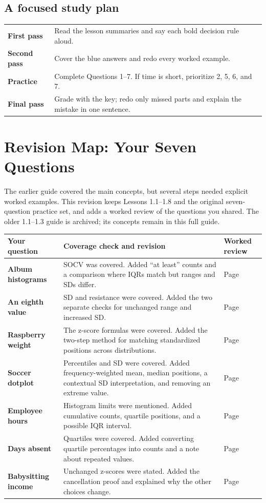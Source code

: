 \documentclass[11pt]{article}
\begin{document}
\subsection*{A focused study plan}
\begin{tabularx}{\textwidth}{>{\bfseries\color{Teal}}p{0.90in} Y}
First pass & Read the lesson summaries and say each bold decision rule aloud.\\
Second pass & Cover the blue answers and redo every worked example.\\
Practice & Complete Questions 1--7. If time is short, prioritize 2, 5, 6, and 7.\\
Final pass & Grade with the key; redo only missed parts and explain the mistake in one sentence.\\
\end{tabularx}

\newpage
\section{Revision Map: Your Seven Questions}

The earlier guide covered the main concepts, but several steps needed explicit worked examples. This revision keeps Lessons 1.1--1.8 and the original seven-question practice set, and adds a worked review of the questions you shared. The older 1.1--1.3 guide is archived; its concepts remain in this full guide.

\begin{tabularx}{\textwidth}{>{\raggedright\arraybackslash\bfseries\color{Navy}}p{1.30in} Y >{\raggedright\arraybackslash}p{1.30in}}
\toprule
Your question & Coverage check and revision & Worked review\\
\midrule
Album histograms & SOCV was covered. Added ``at least'' counts and a comparison where IQRs match but ranges and SDs differ. & Page \pageref{review:albums}\\
An eighth value & SD and resistance were covered. Added the two separate checks for unchanged range and increased SD. & Page \pageref{review:add}\\
Raspberry weight & The z-score formulas were covered. Added the two-step method for matching standardized positions across distributions. & Page \pageref{review:fruit}\\
Soccer dotplot & Percentiles and SD were covered. Added frequency-weighted mean, median positions, a contextual SD interpretation, and removing an extreme value. & Page \pageref{review:soccer}\\
Employee hours & Histogram limits were mentioned. Added cumulative counts, quartile positions, and a possible IQR interval. & Page \pageref{review:histogram}\\
Days absent & Quartiles were covered. Added converting quartile percentages into counts and a note about repeated values. & Page \pageref{review:absences}\\
Babysitting income & Unchanged z-scores were stated. Added the cancellation proof and explained why the other choices change. & Page \pageref{review:scaling}\\
\bottomrule
\end{tabularx}
\end{document}
